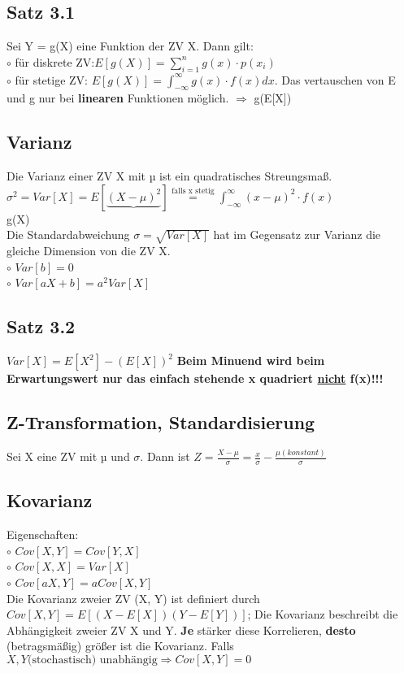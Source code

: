 \subsection{Satz 3.1}
Sei Y = g(X) eine Funktion der ZV X. Dann gilt:\\
  $\circ$ für diskrete ZV:$E[g(X)] = \sum_{i=1}^{n} g(x) \cdot p(x_ {i})$\\
  $\circ$ für stetige ZV: $E[g(X)] = \int_{- \infty}^{\infty} g(x) \cdot f(x) dx$. Das vertauschen von E und g nur bei \textbf{linearen} Funktionen möglich. $\Rightarrow$ g(E[X])
\subsection{Varianz}
Die Varianz einer ZV X mit µ ist ein quadratisches Streungsmaß. $\sigma^2 = Var[X] = E[\underbrace{(X - \mu )^2}] \stackrel{\text{falls x stetig}}{=} \int_{-\infty}^{\infty} (x-\mu)^2 \cdot f(x)$\\
g(X)\\
Die Standardabweichung $\sigma = \sqrt{Var[X]}$ hat im Gegensatz zur Varianz die gleiche Dimension von die ZV X.\\
  $\circ$ $Var[b] = 0$\\
  $\circ$ $Var[aX + b] = a^2 Var[X]$
\subsection{Satz 3.2}
$Var[X] = E[X^2] - (E[X])^2$ \textbf{Beim Minuend wird beim Erwartungswert nur das einfach stehende x quadriert \underline{nicht} f(x)!!!}
\subsection{Z-Transformation, Standardisierung}
Sei X eine ZV mit µ und $\sigma$. Dann ist $Z = \frac{X - \mu}{\sigma} = \frac{x}{\sigma} - \frac{\mu (konstant)}{\sigma}$ 
\subsection{Kovarianz}
Eigenschaften:\\
  $\circ$ $Cov[X, Y] = Cov[Y,X]$\\
  $\circ$ $Cov[X, X] = Var[X]$\\
  $\circ$ $Cov[aX, Y] = a Cov[X,Y]$\\
Die Kovarianz zweier ZV (X, Y) ist definiert durch
$Cov[X, Y] = E[ ( X - E[X] )( Y-E[Y] ) ] $; 
Die Kovarianz beschreibt die Abhängigkeit zweier ZV X und Y. \textbf{Je} stärker diese Korrelieren, \textbf{desto} (betragsmäßig) größer ist die Kovarianz. Falls $X, Y \text{(stochastisch) unabhängig} \Rightarrow Cov[X, Y] = 0$ 
